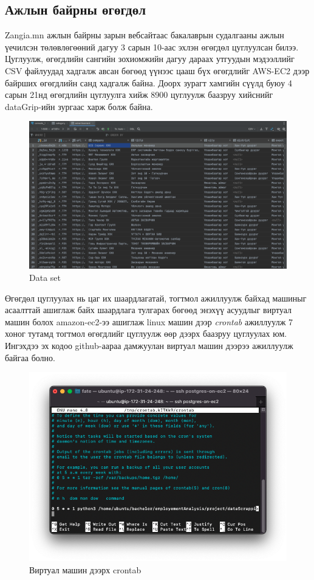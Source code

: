 \subsection{Ажлын байрны өгөгдөл}
Zangia.mn ажлын байрны зарын вебсайтаас бакалаврын судалгааны ажлын үечилсэн төлөвлөгөөний дагуу 3 сарын 10-аас эхлэн өгөгдөл цуглуулсан билээ. Цуглуулж, өгөгдлийн сангийн зохиомжийн дагуу дараах утгуудын мэдээллийг CSV файлуудад хадгалж авсан бөгөөд үүнээс цааш бүх өгөгдлийг AWS-EC2 дээр байрших өгөгдлийн санд хадгалж байна.  
Доорх зурагт хамгийн сүүлд буюу 4 сарын 21нд өгөгдлийн цуглуулга хийж 8900 цуглуулж баазруу хийснийг dataGrip-ийн зургаас харж болж байна. 
\begin{figure}[ht]
  \centering
  \includegraphics[width=\textwidth-4cm]{images/dataSet.png}
  \caption{Data set}\label{fig:dataSet1}
\end{figure}
Өгөгдөл цуглуулах нь цаг их шаардлагатай, тогтмол ажиллуулж байхад машиныг асаалттай ашиглаж байх шаардлага тулгарах бөгөөд энэхүү асуудлыг виртуал машин болох amazon-ec2-ээ ашиглаж linux машин дээр \textit{crontab} ажиллуулж 7 хоног тутамд тогтмол өгөгдлийг цуглуулж өөр дээрх баазруу цуглуулах юм. Ингэхдээ эх кодоо github-аараа дамжуулан виртуал машин дээрээ ажиллуулж байгаа болно. 
\begin{figure}[ht]
  \centering
  \includegraphics[width=\textwidth-4cm]{images/crontab.png}
  \caption{Виртуал машин дээрх crontab}\label{fig:crontab}
\end{figure}
\newpage
